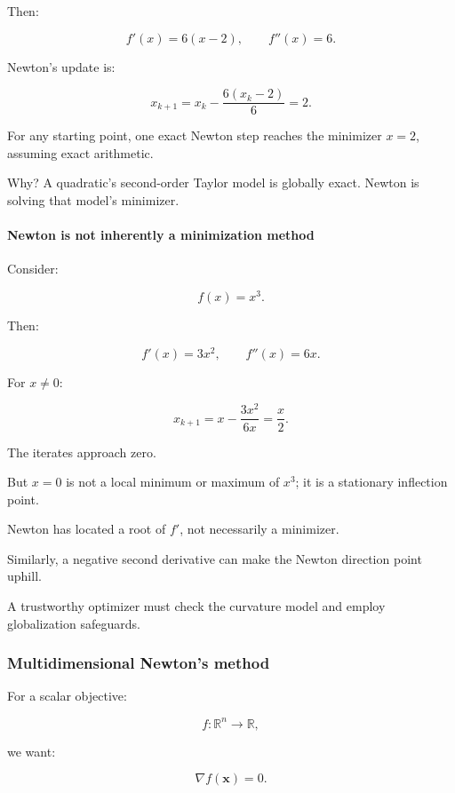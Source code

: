 Then:

\[
f'(x)=6(x-2), \qquad f''(x)=6.
\]

Newton's update is:

\[
x_{k+1} = x_k-\frac{6(x_k-2)}6 =2.
\]

For any starting point, one exact Newton step reaches the minimizer \(x=2\), assuming exact arithmetic.

Why? A quadratic's second-order Taylor model is globally exact. Newton is solving that model's minimizer.

\paragraph{Newton is not inherently a minimization method}\label{02-foundations-ii-ch026-newton-is-not-inherently-a-minimization-method}

\hypertarget{02-foundations-ii-ch026-newton-is-not-inherently-a-minimization-method}{}

Consider:

\[
f(x)=x^3.
\]

Then:

\[
f'(x)=3x^2,\qquad f''(x)=6x.
\]

For \(x\ne0\):

\[
x_{k+1} = x-\frac{3x^2}{6x} =\frac x2.
\]

The iterates approach zero.

But \(x=0\) is not a local minimum or maximum of \(x^3\); it is a stationary inflection point.

Newton has located a root of \(f'\), not necessarily a minimizer.

Similarly, a negative second derivative can make the Newton direction point uphill.

A trustworthy optimizer must check the curvature model and employ globalization safeguards.

\subsubsection{Multidimensional Newton's method}\label{02-foundations-ii-ch026-multidimensional-newtons-method}

\hypertarget{02-foundations-ii-ch026-multidimensional-newtons-method}{}

For a scalar objective:

\[
f:\mathbb R^n\to\mathbb R,
\]

we want:

\[
\nabla f(\mathbf x)=0.
\]

